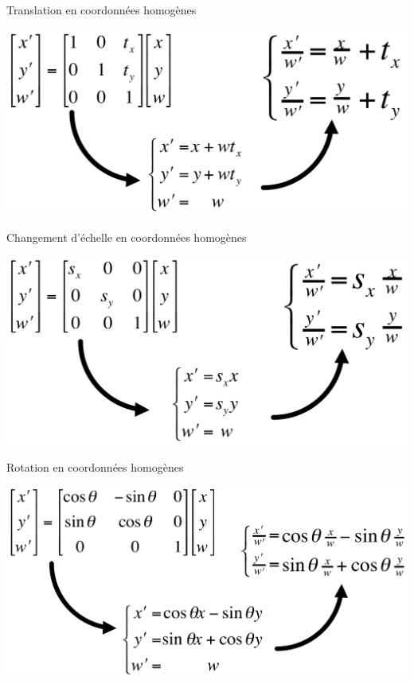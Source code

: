 \begin{frame}{Translation en coordonnées homogènes}
\begin{center}
\includegraphics[width=.8\textwidth]{figs/transh.png}
\end{center}
\end{frame}

\begin{frame}{Changement d'échelle en coordonnées homogènes}
\begin{center}
\includegraphics[width=.8\textwidth]{figs/scaleh.png}
\end{center}
\end{frame}

\begin{frame}{Rotation en coordonnées homogènes}
\begin{center}
\includegraphics[width=.8\textwidth]{figs/roth.png}
\end{center}
\end{frame}

